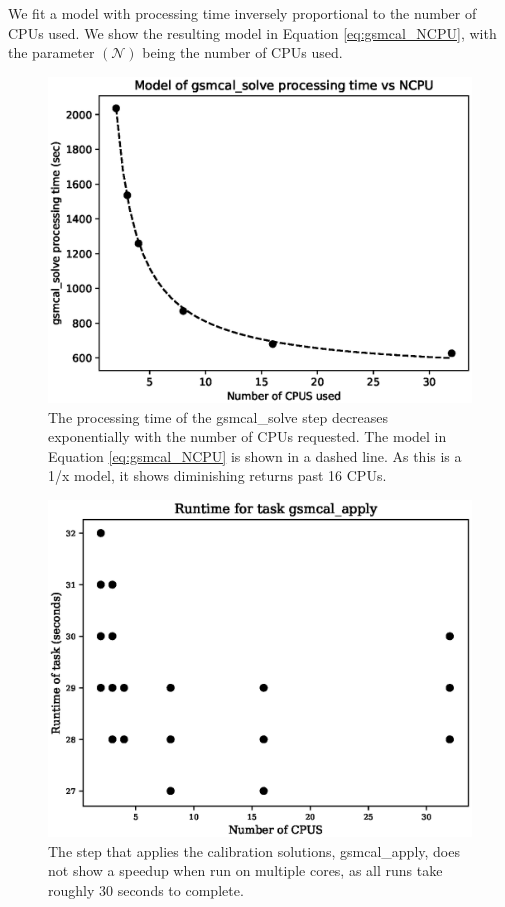 We fit a model with processing time inversely proportional to the number of CPUs used. We show the resulting model in Equation \ref{eq:gsmcal_NCPU}, with the parameter $(\mathcal{N})$ being the number of CPUs used. 

\begin{figure}
    \includegraphics[width=0.95\linewidth]{figures/gsmcal_NCPU_and_model.eps}
      \caption{The processing time of the {\selectfont gsmcal\_solve} step decreases exponentially with the number of CPUs requested. The model in Equation \ref{eq:gsmcal_NCPU} is shown in a dashed line. As this is a 1/x model, it shows diminishing returns past 16 CPUs. }
	\label{fig:gsmcal_solve_NCPU}
\end{figure}

\begin{figure}
    \includegraphics[width=0.95\linewidth]{figures/gsmcal_apply_NCPU.eps}
      \caption{The step that applies the calibration solutions, {\selectfont gsmcal\_apply}, does not show a speedup when run on multiple cores, as all runs take roughly 30 seconds to complete.  }
	\label{fig:gsmcal_apply_NCPU}
\end{figure}

